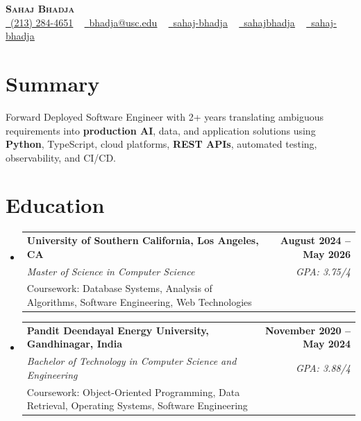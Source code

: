 \documentclass[letterpaper,10pt]{article}
\makeatletter
\newcommand{\sectionGap}{\vspace{-8pt}}
\newcommand{\resumeEduSubheading}[5]{\vspace{-1pt}\item\begin{tabular*}{1.0\textwidth}[t]{l@{\extracolsep{\fill}}r}\textbf{#1} & \textbf{\small #2} \\\textit{\small #3} & \textit{\small #4} \\\small #5 & \\\end{tabular*}\vspace{-4pt}}
\newcommand{\resumeSubHeadingListStart}{\begin{itemize}[leftmargin=0.0in, label={}]}
\newcommand{\resumeSubHeadingListEnd}{\end{itemize}}
\makeatother
\begin{document}
\begin{center}
{\Huge \scshape \textbf{Sahaj Bhadja}} \\ \vspace{1pt}
\small \href{tel:2132844651}{\faPhone\ \underline{(213) 284-4651}} ~ \href{mailto:bhadja@usc.edu}{\raisebox{-0.2\height}\faEnvelope\ \underline{bhadja@usc.edu}} ~
\href{https://www.linkedin.com/in/sahaj-bhadja/}{\raisebox{-0.2\height}\faLinkedin\ \underline{sahaj-bhadja}} ~ \href{https://github.com/SAHAJ-BHADJA}{\raisebox{-0.2\height}\faGithub\ \underline{sahajbhadja}} ~
\href{https://sahaj-bhadja.vercel.app/}{\raisebox{-0.2\height}\faGlobe\ \underline{sahaj-bhadja}}
\end{center}
\vspace{-16pt}
\section{Summary}
\begin{itemize}[leftmargin=0.15in, label={}]
\small{\item{Forward Deployed Software Engineer with 2+ years translating ambiguous requirements into \textbf{production AI}, data, and application solutions using \textbf{Python}, TypeScript, cloud platforms, \textbf{REST APIs}, automated testing, observability, and CI/CD.}}
\end{itemize}
\sectionGap
\section{Education}
\resumeSubHeadingListStart
\resumeEduSubheading{University of Southern California, Los Angeles, CA}{August 2024 -- May 2026}{Master of Science in Computer Science}{GPA: 3.75/4}{Coursework: Database Systems, Analysis of Algorithms, Software Engineering, Web Technologies}
\resumeEduSubheading{Pandit Deendayal Energy University, Gandhinagar, India}{November 2020 -- May 2024}{Bachelor of Technology in Computer Science and Engineering}{GPA: 3.88/4}{Coursework: Object-Oriented Programming, Data Retrieval, Operating Systems, Software Engineering}
\resumeSubHeadingListEnd
\sectionGap
\end{document}
